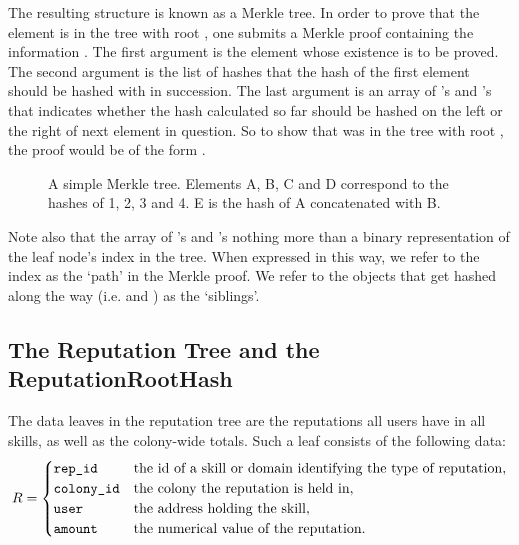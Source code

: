 The resulting structure is known as a Merkle tree. In order to prove that the element  is in the tree with root , one submits a Merkle proof containing the information . The first argument is the element whose existence is to be proved. The second argument is the list of hashes that the hash of the first element should be hashed with in succession. The last argument is an array of 's and 's that indicates whether the hash calculated so far should be hashed on the left or the right of next element in question. So to show that  was in the tree with root , the proof would be of the form .
\begin{figure}
\centering
 \caption{A simple Merkle tree. Elements A, B, C and D correspond to the hashes of 1, 2, 3 and 4. E is the hash of A concatenated with B.}
 \label{fig:Merkleexample}
\end{figure}

Note also that the array of 's and 's nothing more than a binary representation of the leaf node's index in the tree. When expressed in this way, we refer to the index as the `path' in the Merkle proof. We refer to the objects that get hashed along the way (i.e.  and ) as the `siblings'.


\subsection{The Reputation Tree and the ReputationRootHash}\label{sec:reptree}
The data leaves in the reputation tree are the reputations all users have in all skills, as well as the colony-wide totals. Such a leaf consists of the following data:
\[
R = 
\begin{cases}
 \texttt{rep\_id} & \textnormal{the id of a skill or domain identifying the type of reputation},\\
 \texttt{colony\_id} & \textnormal{the colony the reputation is held in},\\
 \texttt{user} & \textnormal{the address holding the skill},\\
 \texttt{amount} & \textnormal{the numerical value of the reputation}.
\end{cases}
\]

